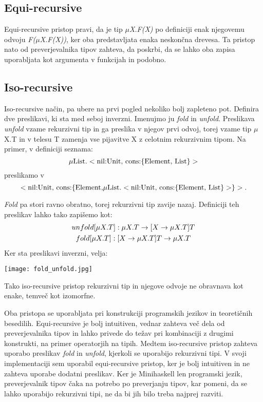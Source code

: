 \documentclass[12pt,a4paper,openany]{book}
\begin{document}
\subsection{Equi-recursive}
Equi-recursive pristop pravi, da je tip \emph{\(\mu\)X.F(X)} po definiciji enak njegovemu odvoju \emph{F(\(\mu\)X.F(X))}, ker oba predstavljata enaka neskončna drevesa. Ta pristop nato od 
preverjevalnika tipov zahteva, da poskrbi, da se lahko oba zapisa uporabljata kot argumenta v funkcijah in podobno.

\subsection{Iso-recursive}
Iso-recursive način, pa ubere na prvi pogled nekoliko bolj zapleteno pot. Definira dve preslikavi, ki sta med seboj inverzni. Imenujmo ju \emph{fold} in \emph{unfold}. Preslikava 
\emph{unfold} vzame rekurzivni tip in ga preslika v njegov prvi odvoj, torej vzame tip \(\mu\)X.T in v telesu T zamenja vse pijavitve X z celotnim rekurzivnim tipom. Na primer, v definiciji 
seznama: 
\begin{equation}
    \mu \text{List.}<\text{nil:Unit, cons:}\{\text{Element, List}\}> \notag
\end{equation}
preslikamo v
\begin{equation}
    <\text{nil:Unit, cons:}\{\text{Element,} \mu \text{List.}<\text{nil:Unit, cons:}\{\text{Element, List}\}>\}>. \notag
\end{equation}
  
\emph{Fold} pa stori ravno obratno, torej rekurzivni tip zavije nazaj. Definiciji teh preslikav lahko tako zapišemo kot:
\begin{gather}
    unfold[\mu X.T]: \mu X.T \rightarrow [X \rightarrow \mu X.T] T \notag\\
    fold[\mu X.T]: [X \rightarrow \mu X.T] T \rightarrow \mu X.T \notag
\end{gather}
Ker sta preslikavi inverzni, velja:

\begin{center}
\texttt{[image: fold\_unfold.jpg]}
\end{center}

Tako iso-recursive pristop rekurzivni tip in njegove odvoje ne obravnava kot enake, temveč kot izomorfne.

Oba pristopa se uporabljata pri konstrukciji programskih jezikov in teoretičnih besedilih. Equi-recursive je bolj intuitiven, vednar zahteva več dela od preverjevalnika tipov in 
lahko privede do težav pri kombinaciji z drugimi konstrukti, na primer operatorjih na tipih. Medtem iso-recursive pristop zahteva uporabo preslikav \emph{fold} in \emph{unfold}, kjerkoli 
se uporabijo rekurzivni tipi. V svoji implementaciji sem uporabil equi-recursive pristop, ker je bolj intuitiven in ne zahteva uporabe dodatni preslikav. Ker je Minihaskell len programski 
jezik, preverjevalnik tipov čaka na potrebo po preverjanju tipov, kar pomeni, da se lahko uporabijo rekurzivni tipi, ne da bi jih bilo treba najprej razviti.
\end{document}
